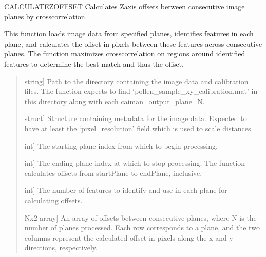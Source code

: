 \documentclass[letterpaper,10pt,english]{sphinxmanual}
\begin{document}
\begin{fulllineitems}
\label{\detokenize{api/core:calculateZOffset}}
\pysigstartsignatures
{}
\pysigstopsignatures
\sphinxAtStartPar
CALCULATEZOFFSET Calculates Z\sphinxhyphen{}axis offsets between consecutive image planes by cross\sphinxhyphen{}correlation.

\sphinxAtStartPar
This function loads image data from specified planes, identifies features
in each plane, and calculates the offset in pixels between these features
across consecutive planes. The function maximizes cross\sphinxhyphen{}correlation on regions
around identified features to determine the best match and thus the offset.
\begin{quote}\begin{description}
\begin{description}
\sphinxlineitem{\sphinxstylestrong{datapath}}{[}string{]}
\sphinxAtStartPar
Path to the directory containing the image data and calibration files.
The function expects to find ‘pollen\_sample\_xy\_calibration.mat’ in this directory along with each caiman\_output\_plane\_N.

\sphinxlineitem{\sphinxstylestrong{metadata}}{[}struct{]}
\sphinxAtStartPar
Structure containing metadata for the image data. Expected to have at
least the ‘pixel\_resolution’ field which is used to scale distances.

\sphinxlineitem{\sphinxstylestrong{startPlane}}{[}int{]}
\sphinxAtStartPar
The starting plane index from which to begin processing.

\sphinxlineitem{\sphinxstylestrong{endPlane}}{[}int{]}
\sphinxAtStartPar
The ending plane index at which to stop processing. The function
calculates offsets from startPlane to endPlane, inclusive.

\sphinxlineitem{\sphinxstylestrong{numFeatures}}{[}int{]}
\sphinxAtStartPar
The number of features to identify and use in each plane for
calculating offsets.

\end{description}

\begin{description}
\sphinxlineitem{\sphinxstylestrong{offsets}}{[}Nx2 array{]}
\sphinxAtStartPar
An array of offsets between consecutive planes, where N is the number
of planes processed. Each row corresponds to a plane, and the two columns
represent the calculated offset in pixels along the x and y directions,
respectively.


\end{description}
\end{description}
\end{quote}
\end{fulllineitems}
\end{document}
